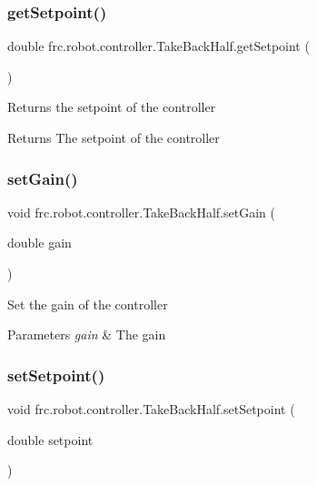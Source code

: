 \subsubsection{\texorpdfstring{getSetpoint()}{getSetpoint()}}
{\footnotesize\ttfamily double frc.\+robot.\+controller.\+Take\+Back\+Half.\+get\+Setpoint (\begin{DoxyParamCaption}{ }\end{DoxyParamCaption})\hspace{0.3cm}{\ttfamily [inline]}}

Returns the setpoint of the controller

\begin{DoxyReturn}{Returns}
The setpoint of the controller 
\end{DoxyReturn}
\mbox{\label{classfrc_1_1robot_1_1controller_1_1_take_back_half_ac08469c2b2a9dc61cbd197906cd2b4ce}} 
\subsubsection{\texorpdfstring{setGain()}{setGain()}}
{\footnotesize\ttfamily void frc.\+robot.\+controller.\+Take\+Back\+Half.\+set\+Gain (\begin{DoxyParamCaption}\item[{double}]{gain }\end{DoxyParamCaption})\hspace{0.3cm}{\ttfamily [inline]}}

Set the gain of the controller


\begin{DoxyParams}{Parameters}
{\em gain} & The gain \\
\hline
\end{DoxyParams}
\mbox{\label{classfrc_1_1robot_1_1controller_1_1_take_back_half_a171ce016e6e4eb4484c884ee5a0d024a}} 
\subsubsection{\texorpdfstring{setSetpoint()}{setSetpoint()}}
{\footnotesize\ttfamily void frc.\+robot.\+controller.\+Take\+Back\+Half.\+set\+Setpoint (\begin{DoxyParamCaption}\item[{double}]{setpoint }\end{DoxyParamCaption})\hspace{0.3cm}{\ttfamily [inline]}}

